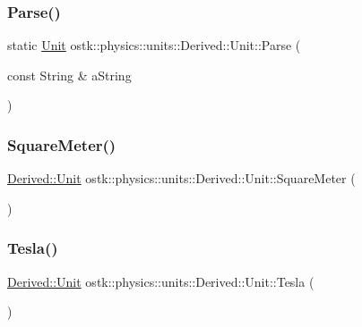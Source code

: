 \subsubsection{\texorpdfstring{Parse()}{Parse()}}
{\footnotesize\ttfamily static \hyperlink{classostk_1_1physics_1_1units_1_1_derived_1_1_unit}{Unit} ostk\+::physics\+::units\+::\+Derived\+::\+Unit\+::\+Parse (\begin{DoxyParamCaption}\item[{const String \&}]{a\+String }\end{DoxyParamCaption})\hspace{0.3cm}{\ttfamily [static]}}

\mbox{\label{classostk_1_1physics_1_1units_1_1_derived_1_1_unit_a3788de147adef6a77d6f7e6df52e52ed}} 
\subsubsection{\texorpdfstring{Square\+Meter()}{SquareMeter()}}
{\footnotesize\ttfamily \hyperlink{classostk_1_1physics_1_1units_1_1_derived_1_1_unit}{Derived\+::\+Unit} ostk\+::physics\+::units\+::\+Derived\+::\+Unit\+::\+Square\+Meter (\begin{DoxyParamCaption}{ }\end{DoxyParamCaption})\hspace{0.3cm}{\ttfamily [static]}}

\mbox{\label{classostk_1_1physics_1_1units_1_1_derived_1_1_unit_a4a5940946d019226cf16ff24577ccfe4}} 
\subsubsection{\texorpdfstring{Tesla()}{Tesla()}}
{\footnotesize\ttfamily \hyperlink{classostk_1_1physics_1_1units_1_1_derived_1_1_unit}{Derived\+::\+Unit} ostk\+::physics\+::units\+::\+Derived\+::\+Unit\+::\+Tesla (\begin{DoxyParamCaption}{ }\end{DoxyParamCaption})\hspace{0.3cm}{\ttfamily [static]}}

